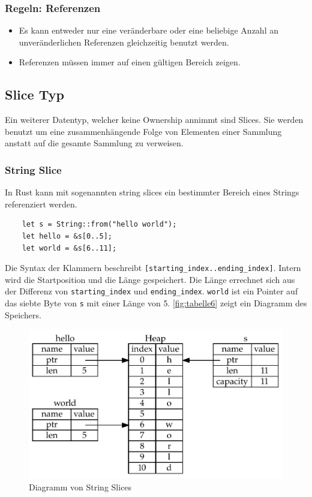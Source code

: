 \subsubsection{Regeln: Referenzen}

\begin{itemize}
    \item Es kann entweder nur eine veränderbare oder eine beliebige Anzahl an unveränderlichen Referenzen gleichzeitig benutzt werden.
    \item Referenzen müssen immer auf einen gültigen Bereich zeigen.
\end{itemize}

\subsection{Slice Typ}\label{chap:slice}

Ein weiterer Datentyp, welcher keine Ownership annimmt sind Slices. Sie werden benutzt um eine zusammenhängende Folge von Elementen einer Sammlung anstatt auf die gesamte Sammlung zu verweisen.

\subsubsection{String Slice}

In Rust kann mit sogenannten \glqq string slices\grqq{} ein bestimmter Bereich eines Strings referenziert werden.

\begin{lstlisting}
    let s = String::from("hello world");
    let hello = &s[0..5];
    let world = &s[6..11];
\end{lstlisting}

Die Syntax der Klammern beschreibt \verb"[starting_index..ending_index]". Intern wird die Startposition und die Länge gespeichert. Die Länge errechnet sich aus der Differenz von \verb"starting_index" und \verb"ending_index". \verb"world" ist ein Pointer auf das siebte Byte von \verb"s" mit einer Länge von 5. \autoref{fig:tabelle6} zeigt ein Diagramm des Speichers.

\begin{figure}[htbp]
    \centering
    \includegraphics[scale=0.9]{Programmierung/Tabelle6.pdf}
    \caption{Diagramm von String Slices}
    \label{fig:tabelle6}
\end{figure}

